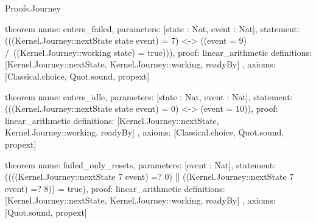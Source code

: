 \begin{lexlean}{Proofs.Journey}
\begin{semanticmodule}
theorem{
  name: enters_failed,
  parameters: [state : Nat, event : Nat],
  statement: (((Kernel.Journey::nextState state event) = 7) <-> ((event = 9) /\ ((Kernel.Journey::working state) = true))),
  proof: linear_arithmetic{
    definitions: [Kernel.Journey::nextState, Kernel.Journey::working, readyBy]
  },
  axioms: [Classical.choice, Quot.sound, propext]
}

theorem{
  name: enters_idle,
  parameters: [state : Nat, event : Nat],
  statement: (((Kernel.Journey::nextState state event) = 0) <-> (event = 10)),
  proof: linear_arithmetic{
    definitions: [Kernel.Journey::nextState, Kernel.Journey::working, readyBy]
  },
  axioms: [Classical.choice, Quot.sound, propext]
}

theorem{
  name: failed_only_resets,
  parameters: [event : Nat],
  statement: ((((Kernel.Journey::nextState 7 event) =? 0) || ((Kernel.Journey::nextState 7 event) =? 8)) = true),
  proof: linear_arithmetic{
    definitions: [Kernel.Journey::nextState, Kernel.Journey::working, readyBy]
  },
  axioms: [Quot.sound, propext]
}
\end{semanticmodule}
\end{lexlean}
